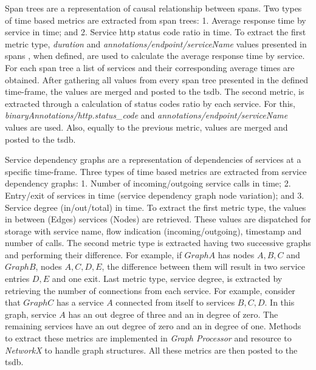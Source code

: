 Span trees are a representation of causal relationship between spans. Two types of time based metrics are extracted from span trees: 1. Average response time by service in time; and 2. Service \gls{http} status code ratio in time. To extract the first metric type, \emph{duration} and \emph{annotations/endpoint/serviceName} values presented in spans , when defined, are used to calculate the average response time by service. For each span tree a list of services and their corresponding average times are obtained. After gathering all values from every span tree presented in the defined time-frame, the values are merged and posted to the \gls{tsdb}. The second metric, is extracted through a calculation of status codes ratio by each service. For this, \emph{binaryAnnotations/http.status\_code} and \emph{annotations/endpoint/serviceName} values are used. Also, equally to the previous metric, values are merged and posted to the \gls{tsdb}.

Service dependency graphs are a representation of dependencies of services at a specific time-frame. Three types of time based metrics are extracted from service dependency graphs: 1. Number of incoming/outgoing service calls in time; 2. Entry/exit of services in time (service dependency graph node variation); and 3. Service degree (in/out/total) in time. To extract the first metric type, the values in between (Edges) services (Nodes) are retrieved. These values are dispatched for storage with service name, flow indication (incoming/outgoing), timestamp and number of calls. The second metric type is extracted having two successive graphs and performing their difference. For example, if $Graph A$ has nodes ${A, B, C}$ and $Graph B$, nodes ${A, C, D, E}$, the difference between them will result in two service entries ${D, E}$ and one exit. Last metric type, service degree, is extracted by retrieving the number of connections from each service. For example, consider that $Graph C$ has a service $A$ connected from itself to services ${B, C, D}$. In this graph, service $A$ has an out degree of three and an in degree of zero. The remaining services have an out degree of zero and an in degree of one. Methods to extract these metrics are implemented in \emph{Graph Processor} and resource to \emph{NetworkX} to handle graph structures. All these metrics are then posted to the \gls{tsdb}.

